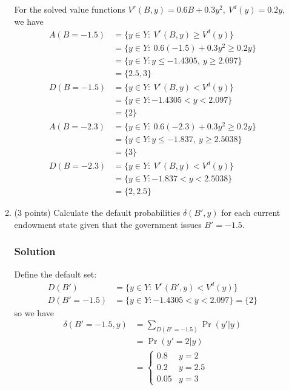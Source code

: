 \documentclass[12pt]{article}
\begin{document}
\begin{enumerate}
\begin{enumerate}[label=(\alph*)]
        For the solved value functions $V^r(B, y) = 0.6B + 0.3y^2, \ V^d(y) = 0.2y$, we have
        \begin{align*}
            A(B=-1.5) &= \{ y \in Y: \ V^r(B,y) \geq V^d(y) \} 
            \\ &=  \{ y \in Y: \ 0.6(-1.5) + 0.3y^2 \geq 0.2y \} 
            \\ &= \{ y \in Y: y\leq -1.4305,\  y \geq 2.097 \} 
            \\ &= \{ 2.5, 3\}
            \\ D(B=-1.5) &= \{ y \in Y: \ V^r(B,y) < V^d(y) \} 
            \\ &= \{ y \in Y: -1.4305 <  y < 2.097 \} 
            \\ &= \{2\}
            \\ A(B=-2.3) &= \{ y \in Y: \ 0.6(-2.3) + 0.3y^2 \geq 0.2y \} 
            \\ &= \{ y \in Y: y\leq -1.837,\  y \geq 2.5038 \} 
            \\ &= \{3\}
             \\ D(B=-2.3) &= \{ y \in Y: \ V^r(B,y) < V^d(y) \} 
            \\ &= \{ y \in Y: -1.837<  y < 2.5038 \} 
            \\ &= \{ 2,2.5\}
        \end{align*}

        \item (3 points) Calculate the default probabilities $\delta(B', y)$ for each current endowment state given that the government issues $B' = -1.5$.
        \subsubsection*{Solution}

        Define the default set: 
        \begin{align*}
            D(B') &= \{ y \in Y: \ V^r(B',y) < V^d(y) \} 
            \\ D(B'=-1.5) &= \{ y \in Y: -1.4305 <  y < 2.097 \}
            = \{ 2\}
        \end{align*}
         so we have 
        \begin{align*}
            \delta(B'= -1.5, y) &= \sum_{D(B'= -1.5)} \Pr(y'|y)
            \\ &=\Pr(y'=2|y)
       \\ & = \begin{cases}
            0.8& y=2
            \\ 0.2 & y=2.5
            \\ 0.05 & y=3
        \end{cases}
        \end{align*}


\end{enumerate}
\end{enumerate}
\end{document}
